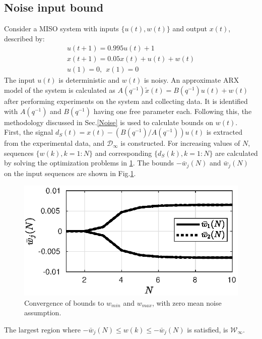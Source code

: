 \documentclass[letterpaper, 10 pt, conference]{ieeeconf}  %
\begin{document}
\begin{enumerate}
	\subsection{Noise input bound}
	Consider a MISO system with inputs $\{u(t),w(t)\}$ and output $x(t)$, described by:
	\begin{equation*}
	\begin{matrix}
	u(t+1) = 0.995u(t)+1 \\
	x(t+1) = 0.05x(t)+u(t)+w(t) \\
	u(1) = 0, \hspace{5pt} x(1) = 0
	\end{matrix}
	\end{equation*}
	The input $u(t)$ is deterministic and $w(t)$ is noisy. An approximate ARX model of the system is calculated as $A(q^{-1})\tilde{x}(t) = B(q^{-1})u(t)+w(t)$ after performing experiments on the system and collecting data. It is identified with $A(q^{-1})$ and $B(q^{-1})$ having one free parameter each. Following this, the methodology discussed in Sec.\ref{Noise} is used to calculate bounds on $w(t)$.
	\\
	First, the signal $d_S(t)=x(t) - (B(q^{-1})/A(q^{-1}))u(t)$ is extracted from the experimental data, and $\mathcal{D}_{\infty}$ is constructed. For increasing values of $N$, sequences $\{w(k),k=1:N\}$ and corresponding $\{d_S(k),k=1:N\}$ are calculated by solving the optimization problems in \ref{bounds}. The bounds $-\bar{w}_j(N)$ and $\bar{w}_j(N)$ on the input sequences are shown in Fig.\ref{bounds}.
	\begin{figure}[h!]
		\hspace{30pt}
		\includegraphics[scale = 0.60]{bounds.eps}
		\caption{Convergence of bounds to $w_{min}$ and $w_{max}$, with zero mean noise assumption.}
		\label{bounds}
	\end{figure} 
	The largest region where $-\bar{w}_j(N) \leq w(k) \leq -\bar{w}_j(N)$ is satisfied, is $\mathcal{W}_{\infty}$. \\

\end{enumerate}
\end{document}

